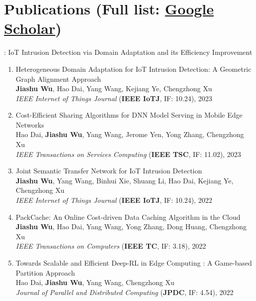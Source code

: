 \documentclass[letterpaper,11pt]{article}
\newcommand{\RNum}[1]{\uppercase\expandafter{\romannumeral #1\relax}}
\begin{document}
\vspace{1pt}

\section{Publications (Full list: \href{https://scholar.google.com/citations?user=wGgUbQkAAAAJ}{Google Scholar})}

\RNum{1}: IoT Intrusion Detection via Domain Adaptation and its Efficiency Improvement
\begin{enumerate}
  \item Heterogeneous Domain Adaptation for IoT Intrusion Detection: A Geometric Graph Alignment Approach\\
  \textbf{Jiashu Wu}, Hao Dai, Yang Wang\textsuperscript{\Letter}, Kejiang Ye, Chengzhong Xu\\
  \textit{IEEE Internet of Things Journal} (\textbf{IEEE IoTJ}, IF: 10.24), 2023

  \item Cost-Efficient Sharing Algorithms for DNN Model Serving in Mobile Edge Networks\\
  Hao Dai, \textbf{Jiashu Wu}, Yang Wang\textsuperscript{\Letter}, Jerome Yen, Yong Zhang, Chengzhong Xu\\
  \textit{IEEE Transactions on Services Computing} (\textbf{IEEE TSC}, IF: 11.02), 2023

  \item Joint Semantic Transfer Network for IoT Intrusion Detection\\
  \textbf{Jiashu Wu}, Yang Wang\textsuperscript{\Letter}, Binhui Xie, Shuang Li, Hao Dai, Kejiang Ye, Chengzhong Xu\\
  \textit{IEEE Internet of Things Journal} (\textbf{IEEE IoTJ}, IF: 10.24), 2022

  \item PackCache: An Online Cost-driven Data Caching Algorithm in the Cloud\\
  \textbf{Jiashu Wu}, Hao Dai, Yang Wang\textsuperscript{\Letter}, Yong Zhang, Dong Huang, Chengzhong Xu\\
  \textit{IEEE Transactions on Computers} (\textbf{IEEE TC}, IF: 3.18), 2022

  \item Towards Scalable and Efficient Deep-RL in Edge Computing : A Game-based Partition Approach\\
  Hao Dai, \textbf{Jiashu Wu}, Yang Wang\textsuperscript{\Letter}, Chengzhong Xu\\
  \textit{Journal of Parallel and Distributed Computing} (\textbf{JPDC}, IF: 4.54), 2022


\end{enumerate}
\end{document}
